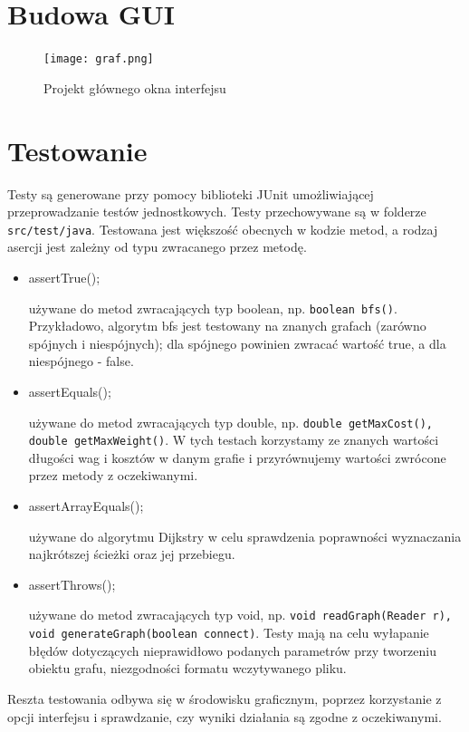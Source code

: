 \documentclass[]{article}
\begin{document}
\section{Budowa GUI}\label{header-n279}

\begin{figure}[h!]
\begin{center}
  \texttt{[image: graf.png]}
  \end{center}
  \caption{Projekt głównego okna interfejsu}
  \label{fig:graf}
\end{figure}

\section{Testowanie}\label{header-n281}
Testy są generowane przy pomocy biblioteki JUnit umożliwiającej przeprowadzanie testów jednostkowych. Testy przechowywane są w folderze \texttt{src/test/java}. Testowana jest większość obecnych w kodzie metod, a rodzaj asercji jest zależny od typu zwracanego przez metodę.

\begin{itemize}
    \item assertTrue();
    
    używane do metod zwracających typ boolean, np. \texttt{boolean bfs()}. Przykładowo, algorytm bfs jest testowany na znanych grafach (zarówno spójnych i niespójnych); dla spójnego powinien zwracać wartość true, a dla niespójnego - false.
    
    \item assertEquals();
    
    używane do metod zwracających typ double, np. \texttt{double getMaxCost(), double getMaxWeight()}. W tych testach korzystamy ze znanych wartości długości wag i kosztów w danym grafie i przyrównujemy wartości zwrócone przez metody z oczekiwanymi.
    
    \item assertArrayEquals();
    
    używane do algorytmu Dijkstry w celu sprawdzenia poprawności wyznaczania najkrótszej ścieżki oraz jej przebiegu.
    
    
    \item assertThrows();
    
    używane do metod zwracających typ void, np. \texttt{void readGraph(Reader r), void generateGraph(boolean connect)}. Testy mają na celu wyłapanie błędów dotyczących nieprawidłowo podanych parametrów przy tworzeniu obiektu grafu, niezgodności formatu wczytywanego pliku.
\end{itemize}

Reszta testowania odbywa się w środowisku graficznym, poprzez korzystanie z opcji interfejsu i sprawdzanie, czy wyniki działania są zgodne z oczekiwanymi.
\end{document}

